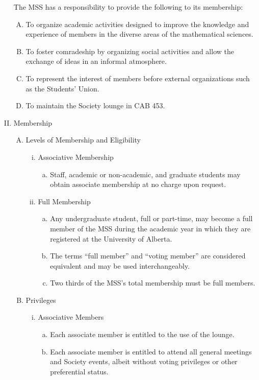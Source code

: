 \documentclass[11pt]{article}
\begin{document}
\begin{enumerate}[I.]
		The MSS has a responsibility to provide the following to its membership:
		\begin{enumerate}[A)]
			\item To organize academic activities designed to improve the knowledge and experience of members in the diverse areas of the mathematical sciences. 
			\item To foster comradeship by organizing social activities and allow the exchange of ideas in an informal atmosphere. 
			\item To represent the interest of members before external organizations such as the Students' Union. 
			\item To maintain the Society lounge in CAB 453.
		\end{enumerate}
	\item Membership
		\begin{enumerate}[A)]
			\item Levels of Membership and Eligibility
				\begin{enumerate}[i)]
					\item Associative Membership
						\begin{enumerate}[a)]
							\item Staff, academic or non-academic, and graduate students may obtain associate membership at no charge upon request. 
						\end{enumerate}
					\item Full Membership
					\begin{enumerate}[a)]
							\item Any undergraduate student, full or part-time, may become a full member of the MSS during the academic year in which they are registered at the University of Alberta.
							\item The terms ``full member'' and ``voting member'' are considered equivalent and may be used interchangeably. 
							\item Two thirds of the MSS's total membership must be full members.
						\end{enumerate}
				\end{enumerate}
			\item Privileges
				\begin{enumerate}[i)]
					\item Associative Members
						\begin{enumerate}[a)]
							\item Each associate member is entitled to the use of the lounge. 
							\item Each associate member is entitled to attend all general meetings and Society events, albeit without voting privileges or other preferential status. 

\end{enumerate}
\end{enumerate}
\end{enumerate}
\end{enumerate}
\end{document}
